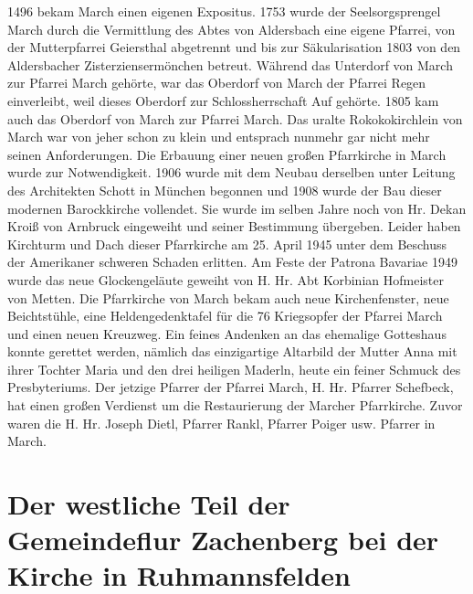 \documentclass{book}
\begin{document}
1496 bekam March einen eigenen Expositus. 1753 wurde der Seelsorgsprengel March
durch die Vermittlung des Abtes von Aldersbach eine eigene Pfarrei, von der
Mutterpfarrei Geiersthal abgetrennt und bis zur Säkularisation 1803 von den
Aldersbacher Zisterziensermönchen betreut. Während das Unterdorf von March zur
Pfarrei March gehörte, war das Oberdorf von March der Pfarrei Regen einverleibt,
weil dieses Oberdorf zur Schlossherrschaft Auf gehörte. 1805 kam auch das
Oberdorf von March zur Pfarrei March. Das uralte Rokokokirchlein von March war
von jeher schon zu klein und entsprach nunmehr gar nicht mehr seinen
Anforderungen. Die Erbauung einer neuen großen Pfarrkirche in March wurde zur
Notwendigkeit. 1906 wurde mit dem Neubau derselben unter Leitung des Architekten
Schott in München begonnen und 1908 wurde der Bau dieser modernen Barockkirche
vollendet. Sie wurde im selben Jahre noch von Hr. Dekan Kroiß von Arnbruck
eingeweiht und seiner Bestimmung übergeben. Leider haben Kirchturm und Dach
dieser Pfarrkirche am 25. April 1945 unter dem Beschuss der Amerikaner schweren
Schaden erlitten. Am Feste der Patrona Bavariae 1949 wurde das neue
Glockengeläute geweiht von H. Hr. Abt Korbinian Hofmeister von Metten. Die
Pfarrkirche von March bekam auch neue Kirchenfenster, neue Beichtstühle, eine
Heldengedenktafel für die 76 Kriegsopfer der Pfarrei March und einen neuen
Kreuzweg. Ein feines Andenken an das ehemalige Gotteshaus konnte gerettet
werden, nämlich das einzigartige Altarbild der Mutter Anna mit ihrer Tochter
Maria und den drei heiligen Maderln, heute ein feiner Schmuck des Presbyteriums.
Der jetzige Pfarrer der Pfarrei March, H. Hr. Pfarrer Schefbeck, hat einen
großen Verdienst um die Restaurierung der Marcher Pfarrkirche. Zuvor waren die
H. Hr. Joseph Dietl, Pfarrer Rankl, Pfarrer Poiger usw. Pfarrer in March.

\section{Der westliche Teil der Gemeindeflur Zachenberg bei der Kirche in
Ruhmannsfelden}
\end{document}
